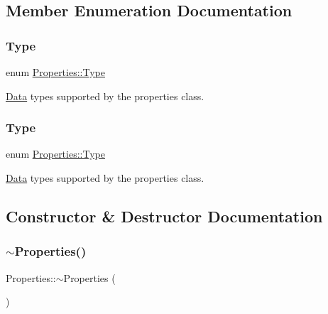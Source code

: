 \subsection{Member Enumeration Documentation}
\mbox{\label{classProperties_a2d14cc7f8d9f987905632969cc4070e9}} 
\subsubsection{\texorpdfstring{Type}{Type}\hspace{0.1cm}{\footnotesize\ttfamily [1/2]}}
{\footnotesize\ttfamily enum \hyperlink{classProperties_a2d14cc7f8d9f987905632969cc4070e9}{Properties\+::\+Type}}

\hyperlink{classData}{Data} types supported by the properties class. \mbox{\label{classProperties_a2d14cc7f8d9f987905632969cc4070e9}} 
\subsubsection{\texorpdfstring{Type}{Type}\hspace{0.1cm}{\footnotesize\ttfamily [2/2]}}
{\footnotesize\ttfamily enum \hyperlink{classProperties_a2d14cc7f8d9f987905632969cc4070e9}{Properties\+::\+Type}}

\hyperlink{classData}{Data} types supported by the properties class. 

\subsection{Constructor \& Destructor Documentation}
\mbox{\label{classProperties_a9a4367c64d90a962fc260128587670dd}} 
\subsubsection{\texorpdfstring{$\sim$\+Properties()}{~Properties()}\hspace{0.1cm}{\footnotesize\ttfamily [1/2]}}
{\footnotesize\ttfamily Properties\+::$\sim$\+Properties (\begin{DoxyParamCaption}{ }\end{DoxyParamCaption})}

